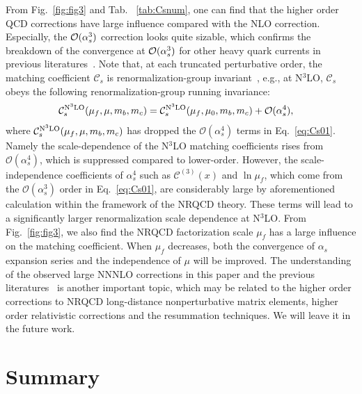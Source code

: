\documentclass[onecolumn,preprintnumbers,aps,superscriptaddress,nofootinbib,prd,notitlepage]{revtex4-1}
\begin{document}
{From Fig.~\ref{fig:fig3} and Tab. ~\ref{tab:Csnum}, one can find that the higher order QCD corrections have large influence compared with
the NLO correction. Especially, the ${\cal O}(\alpha_s^3)$ correction looks quite sizable, which confirms the breakdown of the convergence at ${\cal O}(\alpha_s^3)$ for other heavy quark currents in previous literatures~\cite{Egner:2022jot,Feng:2022ruy,Sang:2022tnh}.
Note that, at each truncated perturbative order, the matching coefficient $\mathcal{C}_s$  is renormalization-group invariant~\cite{Feng:2022ruy,Sang:2022tnh}, e.g., at N$^3$LO, $\mathcal{C}_s$ obeys the following renormalization-group running invariance:
\begin{align}
&\mathcal{C}_s^{\rm N^3LO}(\mu_f,\mu,m_b,m_c) =\mathcal{C}_s^{\rm N^3LO}(\mu_f,\mu_0,m_b,m_c) +\mathcal{O}(\alpha_s^4),
\end{align}
where $\mathcal{C}_s^{\rm N^3LO}(\mu_f,\mu,m_b,m_c)$ has dropped the $\mathcal{O}(\alpha_s^4)$ terms in Eq.~\eqref{eq:Cs01}. Namely the scale-dependence of the N$^3$LO matching coefficients rises
from $\mathcal{O}(\alpha_s^4)$, which is suppressed compared to lower-order.  However, the scale-independence coefficients of $\alpha_s^4$ such as $\mathcal{C}^{(3)}(x)$ and $\ln \mu_f$, which come from the $\mathcal{O}(\alpha_s^3)$ order in Eq.~\eqref{eq:Cs01}, are considerably large by aforementioned  calculation within the framework of  the NRQCD theory. These terms will lead to a significantly larger renormalization scale dependence at N$^3$LO. From Fig.~\ref{fig:fig3}, we also find the NRQCD factorization scale $\mu_f$ has a large influence on the matching coefficient.
When $\mu_f$ decreases, both the convergence of $\alpha_s$ expansion series  and the independence of $\mu$ will be improved.
The understanding of the observed large NNNLO corrections in this paper and the previous literatures~\cite{Egner:2022jot,Feng:2022ruy,Sang:2022tnh} is another important topic, which may
be related to the higher order corrections to NRQCD long-distance nonperturbative matrix elements, higher order relativistic corrections and the resummation techniques. We will leave it in the future work.



\section{Summary~\label{Summary}}

}
\end{document}
